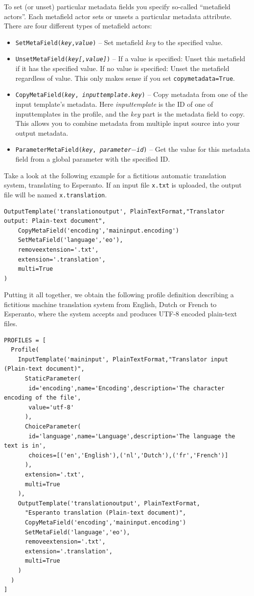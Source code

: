 \documentclass[a4paper,12pt]{report}
\begin{document}
To set (or unset) particular metadata fields you specify so-called ``metafield
actors''. Each metafield actor sets or unsets a particular metadata attribute.
There are four different types of metafield actors:

\begin{itemize}
\item \texttt{SetMetaField(\emph{key},\emph{value})} -- Set metafield \emph{key} to the specified value.
\item \texttt{UnsetMetaField(\emph{key}\emph{[,value]})} -- If a value is specified: Unset this metafield if it has the specified value. If no value is specified: Unset the metafield regardless of value. This only makes sense if you set \texttt{copymetadata=True}.
\item \texttt{CopyMetaField(\emph{key}, \emph{inputtemplate.key})} -- Copy metadata from one of the input template's metadata. Here \emph{inputtemplate} is the ID of one of inputtemplates in the profile, and the \emph{key} part is the metadata field to copy. This allows you to combine metadata from multiple input source into your output metadata.
\item \texttt{ParameterMetaField(\emph{key}, \emph{parameter$-$id})} -- Get the value for this metadata field from a global parameter with the specified ID.
\end{itemize}

Take a look at the following example for a fictitious automatic translation
system, translating to Esperanto. If an input file \texttt{x.txt} is uploaded,
the output file will be named \texttt{x.translation}.

{\footnotesize{
\begin{verbatim}
OutputTemplate('translationoutput', PlainTextFormat,"Translator output: Plain-text document",  
    CopyMetaField('encoding','maininput.encoding')
    SetMetaField('language','eo'),
    removeextension='.txt',
    extension='.translation',
    multi=True
)
\end{verbatim}
}}

Putting it all together, we obtain the following profile definition describing
a fictitious machine translation system from English, Dutch or French to
Esperanto, where the system accepts and produces UTF-8 encoded plain-text
files.

{\footnotesize{
\begin{verbatim}
PROFILES = [ 
  Profile( 
    InputTemplate('maininput', PlainTextFormat,"Translator input (Plain-text document)",  
      StaticParameter(
       id='encoding',name='Encoding',description='The character encoding of the file', 
       value='utf-8'
      ),  
      ChoiceParameter(
       id='language',name='Language',description='The language the text is in', 
       choices=[('en','English'),('nl','Dutch'),('fr','French')]
      ),
      extension='.txt',
      multi=True
    ), 
    OutputTemplate('translationoutput', PlainTextFormat,
      "Esperanto translation (Plain-text document)",  
      CopyMetaField('encoding','maininput.encoding')
      SetMetaField('language','eo'),
      removeextension='.txt',
      extension='.translation',
      multi=True
    )    
  )
]
\end{verbatim}
}}
\end{document}
